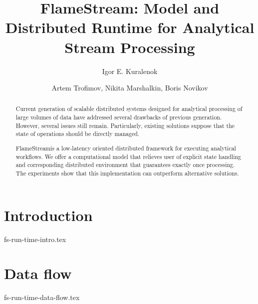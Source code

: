 \documentclass[sigconf]{acmart-edbt2018}
\theoremstyle{remark}
\newcommand {\FlameStream} {FlameStream}
\begin{document}
\title {\FlameStream: Model and Distributed Runtime for Analytical Stream Processing}


\author{Igor E. Kuralenok}

\author{Artem Trofimov, Nikita Marshalkin, Boris Novikov}


\begin{abstract}
Current generation of scalable distributed systems designed for analytical processing of large volumes of data have addressed several drawbacks of previous generation. However, several issues still remain. Particularly, existing solutions suppose that the state of operations should be directly managed.

\FlameStream is a low-latency oriented distributed framework for executing analytical workflows. We offer a computational model that relieves user of explicit state handling and corresponding distributed environment that guarantees exactly once processing. The experiments show that this implementation can outperform alternative solutions.
\end {abstract}

\maketitle


\section {Introduction}
 {fs-run-time-intro.tex}

\section {Data flow}
 {fs-run-time-data-flow.tex}
\end{document}
